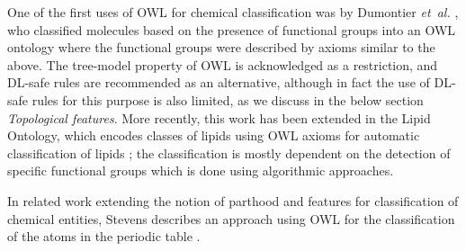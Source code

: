\documentclass[10pt]{bmc_article}
\newenvironment{bmcformat}{\baselineskip20pt\sloppy\setboolean{publ}{false}}{\baselineskip20pt\sloppy}
\begin{document}
\begin{bmcformat}

One of the first uses of OWL for chemical classification was by Dumontier \emph{et~al.} \cite{dumontier2007}, who classified molecules based on the presence of functional groups into an OWL ontology where the functional groups were described by axioms similar to the above. The tree-model property of OWL is acknowledged as a restriction, and DL-safe rules \cite{dumontier2007} are recommended as an alternative, although in fact the use of DL-safe rules for this purpose is also limited, as we discuss in the below section \textit{Topological features}. More recently, this work has been extended in the Lipid Ontology, which encodes classes of lipids using OWL axioms for automatic classification of lipids \cite{chepelevlipids2011}; the classification is mostly dependent on the detection of specific functional groups which is done using algorithmic approaches.
 
In related work extending the notion of parthood and features for classification of chemical entities, Stevens describes an approach using OWL for the classification of the atoms in the periodic table \cite{stevens2011}. 





\end{bmcformat}
\end{document}
